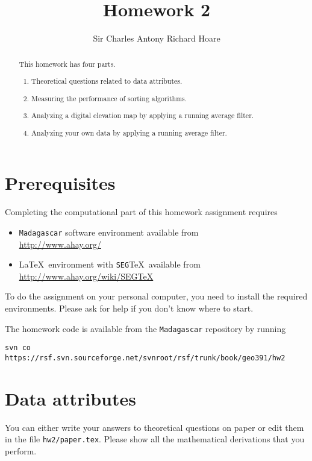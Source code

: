 \author{Sir Charles Antony Richard Hoare}
\title{Homework 2}

\begin{abstract}
  This homework has four parts. 
  \begin{enumerate}
  \item Theoretical questions related to data attributes.
  \item Measuring the performance of sorting algorithms.
  \item Analyzing a digital elevation map by applying a running average filter.
  \item Analyzing your own data by applying a running average filter.
  \end{enumerate}
\end{abstract}

\section{Prerequisites}

Completing the computational part of this homework assignment requires
\begin{itemize}
\item \texttt{Madagascar} software environment available from \\
\url{http://www.ahay.org/}
\item \LaTeX\ environment with \texttt{SEG}\TeX\ available from \\ 
\url{http://www.ahay.org/wiki/SEGTeX}
\end{itemize}
To do the assignment on your personal computer, you need to install
the required environments. Please ask for help if you don't know where
to start.

The homework code is available from the \texttt{Madagascar} repository
by running
\begin{verbatim}
svn co https://rsf.svn.sourceforge.net/svnroot/rsf/trunk/book/geo391/hw2
\end{verbatim}

\section{Data attributes}

You can either write your answers to theoretical questions on paper or
edit them in the file \texttt{hw2/paper.tex}. Please show all the
mathematical derivations that you perform.


